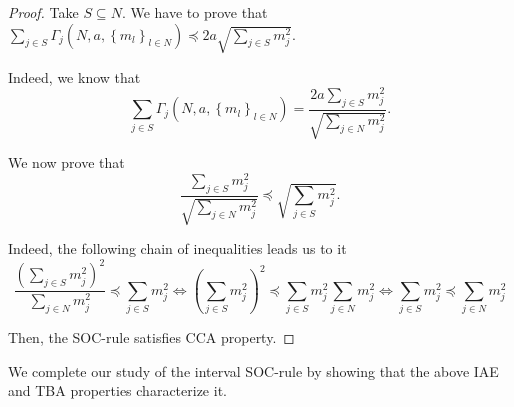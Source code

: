 \documentclass[12pt]{article}
\newtheorem{prop}{\sc Proposition}[section]
\begin{document}
\begin{proof}  
Take $S\subseteq N$. We have to prove that $\sum_{j\in S}\Gamma_j\left(N,a,\left\{ m_l\right\} _{l\in
N}\right)\preceq 2a\sqrt{\sum_{j\in S}m_{j}^{2}}$. 

Indeed, we know that
\begin{equation*}
\sum_{j\in S}\Gamma_j\left(N,a,\left\{ m_l\right\} _{l\in
N}\right)=\frac{2a\sum_{j\in S}
m_{j}^{2}}{\sqrt{\sum_{j\in N}m_{j}^{2}}}.
\end{equation*}

We now prove that 
\begin{equation*}
\frac{\sum_{j\in S}
m_{j}^{2}}{\sqrt{\sum_{j\in N}m_{j}^{2}}} \preceq \sqrt{\sum_{j\in S}m_{j}^{2}}.
\end{equation*}

Indeed, the following chain of inequalities leads us to it 
\begin{equation*}
\frac{\left(\sum_{j\in S}
m_{j}^{2}\right)^2}{\sum_{j\in N}m_{j}^{2}} \preceq \sum_{j\in S}m_{j}^{2}\Leftrightarrow\left(\sum_{j\in S}
m_{j}^{2}\right)^2 \preceq \sum_{j\in S}m_{j}^{2}\sum_{j\in N}m_{j}^{2}\Leftrightarrow \sum_{j\in S}
m_{j}^{2} \preceq\sum_{j\in N}m_{j}^{2}
\end{equation*}%

Then, the SOC-rule satisfies CCA property. 
\end{proof} 


\noindent We complete our study of the interval SOC-rule by showing that the above IAE and TBA properties characterize it. 

\end{document}
